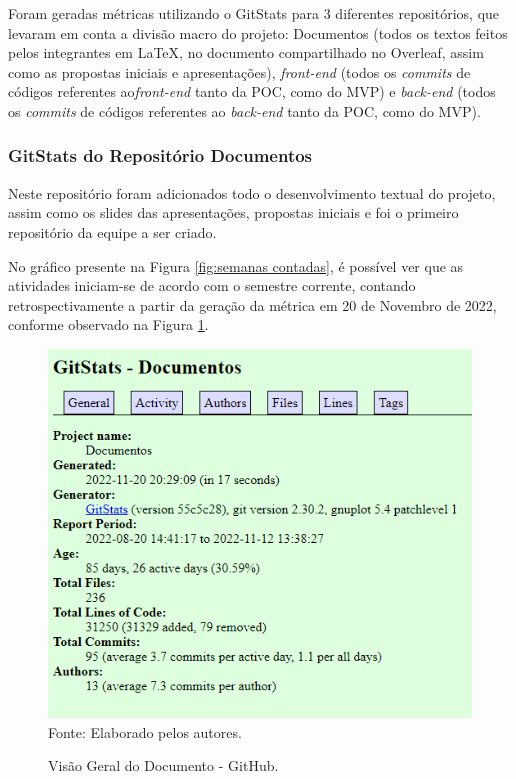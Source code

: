 \documentclass[
    12pt,               %
    openright,          %
    oneside,
    a4paper,            %
    BIBLATEX,           %
    TODO,               %
    english,            %
    brazil              %
    ]{ifsp-spo-inf-ctds}
\begin{document}
    Foram geradas métricas utilizando o GitStats para 3 diferentes repositórios, que levaram em conta a divisão macro do projeto: Documentos (todos os textos feitos pelos integrantes em LaTeX, no documento compartilhado no Overleaf, assim como as propostas iniciais e apresentações), \emph{front-end} (todos os \emph{commits} de códigos referentes ao\emph{front-end} tanto da POC, como do MVP) e \emph{back-end} (todos os \emph{commits} de códigos referentes ao \emph{back-end} tanto da POC, como do MVP).


    \subsubsection{GitStats do Repositório Documentos}

    Neste repositório foram adicionados todo o desenvolvimento textual do projeto, assim como os slides das apresentações, propostas iniciais e foi o primeiro repositório da equipe a ser criado. 

    No gráfico presente na Figura \ref{fig:semanas contadas}, é possível ver que as atividades iniciam-se de acordo com o semestre corrente, contando retrospectivamente a partir da geração da métrica em 20 de Novembro de 2022, conforme observado na Figura \ref{fig:geralDoc}.

    \begin{figure}[H]
            \centering
            \caption{Visão Geral do Documento - GitHub.}
            \includegraphics[width=1 \textwidth]{Gitstats/documento/geralDoc.png}
            {\footnotesize Fonte: Elaborado pelos autores.}
            \label{fig:geralDoc}
    \end{figure}
\end{document}
